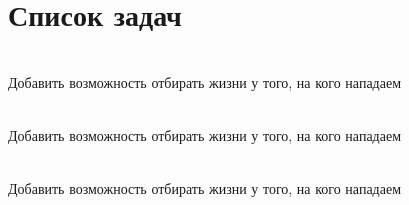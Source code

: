 \chapter{Список задач }
\hypertarget{todo}{}\label{todo}

\begin{DoxyRefList}
\item[{\parbox[t]{\linewidth}{Член \doxylink{class_archer_ad5a62a929801de20b6c53858b8a77256}{Archer::\+attack} () override}}]\hfill \\
\label{todo__todo000003}%
%
Добавить возможность отбирать жизни у того, на кого нападаем  
\item[{\parbox[t]{\linewidth}{Член \doxylink{class_mage_a5ac36b45df55997e4fa1f50ff571b7d1}{Mage::\+attack} () override}}]\hfill \\
\label{todo__todo000002}%
%
Добавить возможность отбирать жизни у того, на кого нападаем  
\item[{\parbox[t]{\linewidth}{Член \doxylink{class_warrior_a0d8d9631bffe5aee5e9420acc544c190}{Warrior::\+attack} () override}}]\hfill \\
\label{todo__todo000001}%
%
Добавить возможность отбирать жизни у того, на кого нападаем 
\end{DoxyRefList}